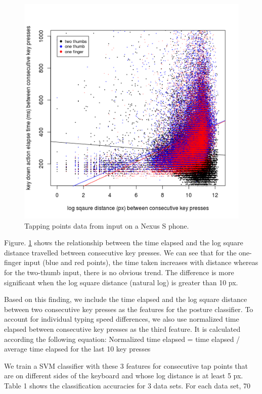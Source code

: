 \documentclass{sigchi}
\begin{document}
\begin{figure}[tb]
  \centering
  \includegraphics[width=1\columnwidth]{figures/time-distance.png}
  \caption{Tapping points data from input on a Nexus S phone.}
  \label{fig:time-distance}
\end{figure}

Figure. \ref{fig:time-distance} shows the relationship between the time elapsed 
and the log square distance travelled between consecutive key presses. We can
see that for the one-finger input (blue and red points), the time taken
increases with distance whereas for the two-thumb input, there is no obvious
trend. The difference is more significant when the log square distance (natural
log) is greater than 10 px.

Based on this finding, we include the time elapsed and the log square distance
between two consecutive key presses as the features for the posture classifier. To account for individual typing speed differences, we also use normalized time elapsed between consecutive key presses as the third feature. It is calculated according the following equation:
Normalized time elapsed = time elapsed / average time elapsed for the last 10 key presses

We train a SVM classifier with these 3 features for consecutive tap points that are on different sides of the keyboard and whose log distance is at least 5 px. Table 1 shows the classification accuracies for 3 data sets. For each data set, 70%
\end{document}
